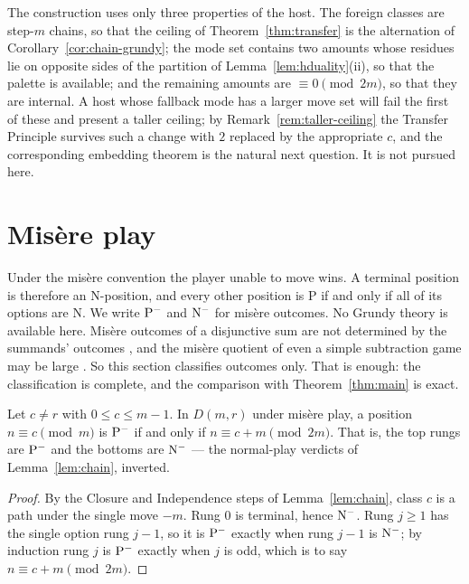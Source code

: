\begin{remark}[Scope]\label{rem:host-scope}
The construction uses only three properties of the host. The foreign
classes are step-$m$ chains, so that the ceiling of
Theorem~\ref{thm:transfer} is the alternation of
Corollary~\ref{cor:chain-grundy}; the mode set contains two amounts
whose residues lie on opposite sides of the partition of
Lemma~\ref{lem:hduality}(ii), so that the palette is available; and
the remaining amounts are $\equiv 0 \pmod{2m}$, so that they are
internal. A host whose fallback mode has a larger move set will fail the
first of these and present a taller ceiling; by
Remark~\ref{rem:taller-ceiling} the Transfer Principle survives such a
change with $2$ replaced by the appropriate $c$, and the corresponding
embedding theorem is the natural next question. It is not pursued here.
\end{remark}

\section{Mis\`ere play}\label{sec:misere}

Under the mis\`ere convention the player unable to move wins. A terminal
position is therefore an N-position, and every other position is P if and
only if all of its options are N. We write $\mathrm{P}^-$ and $\mathrm{N}^-$ for
mis\`ere outcomes. No Grundy theory is available here. Mis\`ere
outcomes of a disjunctive sum are not determined by the summands'
outcomes \cite{lessons}, and the mis\`ere quotient of even a simple
subtraction game may be large \cite{plambeck-siegel}. So this section classifies outcomes only.
That is enough: the classification is complete, and the comparison with
Theorem~\ref{thm:main} is exact.

\begin{lemma}\label{lem:chain-misere}
Let $c \ne r$ with $0 \le c \le m-1$. In $D(m,r)$ under mis\`ere play, a
position $n \equiv c \pmod m$ is $\mathrm{P}^-$ if and only if
$n \equiv c + m \pmod{2m}$. That is, the top rungs are $\mathrm{P}^-$ and the
bottoms are $\mathrm{N}^-$ --- the normal-play verdicts of
Lemma~\ref{lem:chain}, inverted.
\end{lemma}
\begin{proof}
By the Closure and Independence steps of Lemma~\ref{lem:chain}, class $c$
is a path under the single move $-m$. Rung $0$ is terminal, hence
$\mathrm{N}^-$. Rung $j \ge 1$ has the single option rung $j-1$, so it is
$\mathrm{P}^-$ exactly when rung $j-1$ is $\mathrm{N}^-$; by induction rung $j$ is
$\mathrm{P}^-$ exactly when $j$ is odd, which is to say
$n \equiv c + m \pmod{2m}$.
\end{proof}

